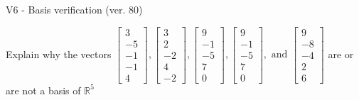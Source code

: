 \begin{exercise}
  \begin{exerciseTitle}V6 - Basis verification (ver. 80)\end{exerciseTitle}
  \begin{exerciseStatement}
    Explain why the vectors \(\left[\begin{array}{r}
3 \\
-5 \\
-1 \\
-1 \\
4
\end{array}\right] , \left[\begin{array}{r}
3 \\
2 \\
-2 \\
4 \\
-2
\end{array}\right] , \left[\begin{array}{r}
9 \\
-1 \\
-5 \\
7 \\
0
\end{array}\right] , \left[\begin{array}{r}
9 \\
-1 \\
-5 \\
7 \\
0
\end{array}\right] , \text{ and } \left[\begin{array}{r}
9 \\
-8 \\
-4 \\
2 \\
6
\end{array}\right]\) are or are not a basis of \(\mathbb{R}^5\)	



\end{exerciseStatement}
\end{exercise}
